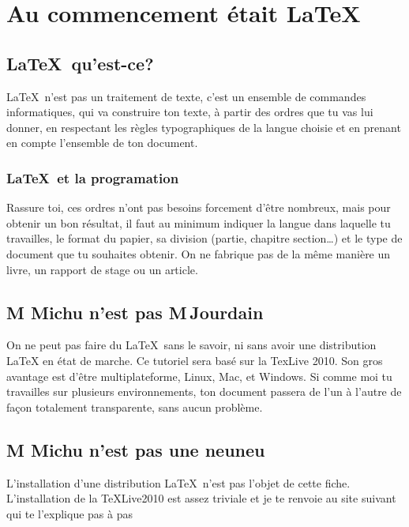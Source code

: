 \documentclass[11pt,dvipsnames]{scrbook}
\newcommand{\michu}{M\up{lle} Michu\xspace}
\begin{document}
\pagestyle{scrheadings} %


\chapter{Au commencement était \LaTeX}\label{chapcommencement}
\section{\LaTeX\ qu'est-ce?}\label{secquestce}
\LaTeX\ n'est pas un traitement de texte, c'est un ensemble de commandes informatiques, qui va construire ton texte, à partir des ordres que tu vas lui donner, en respectant les règles typographiques de la langue choisie et en prenant en compte l'ensemble de ton document. 
\subsection{\LaTeX\ et la programation}\label{subprogramation}

Rassure toi, ces ordres n'ont pas besoins forcement d'être nombreux, mais pour obtenir un bon résultat, il faut au minimum indiquer la langue dans laquelle tu travailles, le format du papier, sa division (partie, chapitre section\dots) et le type de document que tu souhaites obtenir. On ne fabrique pas de la même manière un livre, un rapport de stage ou un article.

\newpage

\section{\michu n'est pas M\,Jourdain}
  
 On ne peut pas faire du \LaTeX\  sans le savoir, ni sans avoir une distribution \LaTeX{} en état de marche. Ce tutoriel sera basé sur la TexLive 2010. Son gros avantage est d'être multiplateforme, Linux, Mac, et Windows. Si comme moi tu travailles sur plusieurs environnements, ton document passera de l'un à l'autre de façon totalement transparente, sans aucun problème. 
 \newpage
  \section{\michu n'est pas une neuneu}\label{secneuneu}
L'installation d'une distribution \LaTeX\ n'est pas l'objet de cette fiche. L'installation de la \TeX Live2010 est assez triviale et je te renvoie au site suivant qui te l'explique pas à pas
\end{document}
